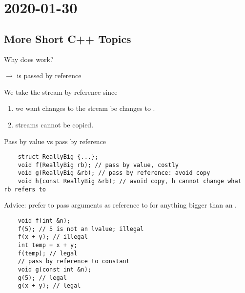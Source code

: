 \section{2020-01-30}
\subsection{More Short C++ Topics}
Why does  work?

 $ \rightarrow $  is passed by reference


We take the stream by reference since 
\begin{enumerate}
    \item we want changes to the stream be changes to .
    \item streams cannot be copied.
\end{enumerate}
Pass by value vs pass by reference
\begin{lstlisting}
    struct ReallyBig {...};
    void f(ReallyBig rb); // pass by value, costly
    void g(ReallyBig &rb); // pass by reference: avoid copy
    void h(const ReallyBig &rb); // avoid copy, h cannot change what rb refers to
\end{lstlisting}
Advice: prefer to pass arguments as reference to  for anything bigger
than an .
\begin{lstlisting}
    void f(int &n);
    f(5); // 5 is not an lvalue; illegal
    f(x + y); // illegal
    int temp = x + y;
    f(temp); // legal
    // pass by reference to constant
    void g(const int &n);
    g(5); // legal
    g(x + y); // legal
\end{lstlisting}
